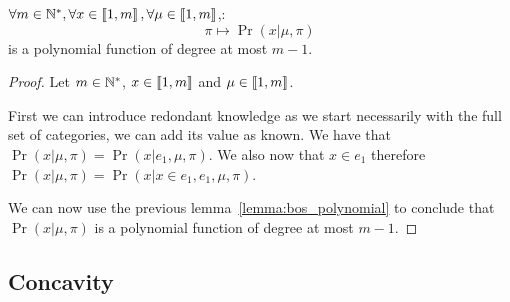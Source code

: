 \begin{thm}
    \label{thm:likelihood_bos_is_polynomial}
    $\forall m \in \mathbb{N}^*, \forall x \in \left\llbracket1, m\right\rrbracket, \forall \mu \in \left\llbracket1, m\right\rrbracket$,:
    \[ \pi \mapsto \Pr(x | \mu, \pi) \]
    is a polynomial function of degree at most $m - 1$.  
\end{thm}
\begin{proof}
    Let $m \in \mathbb{N}^*$, $x \in \left\llbracket1, m\right\rrbracket$ and $\mu \in \left\llbracket1, m\right\rrbracket$. 

    First we can introduce redondant knowledge as we start necessarily with the full set of categories, we can add its value as known. We have that $\Pr(x | \mu, \pi) = \Pr(x | e_1, \mu, \pi)$. We also now that $x \in e_1$ therefore $\Pr(x | \mu, \pi) = \Pr(x | x \in e_1, e_1, \mu, \pi)$.

    We can now use the previous lemma~\ref{lemma:bos_polynomial} to conclude that $\Pr(x | \mu, \pi)$ is a polynomial function of degree at most $m - 1$.
\end{proof}


\subsection{Concavity}

